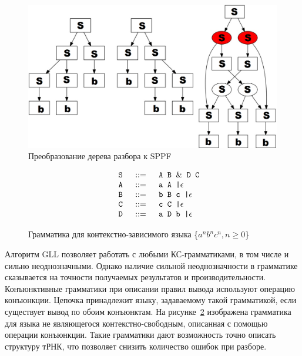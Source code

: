 \documentclass[14pt]{matmex-diploma}
\begin{document}
\begin{figure}
\centering
\includegraphics[width=14cm]{courseworkpictures/SPPF.PNG}
\caption{Преобразование дерева разбора к SPPF}
\label{SPPF}
\end{figure}

\begin{figure}
$$
\begin{array}{crcl}
& \mbox{\texttt{ S }} &::=& \mbox{\texttt{ A B }} \& \mbox{\texttt{ D C}} \\
& \mbox{\texttt{ A }} & ::=& \mbox{\texttt{ a A |}}  \epsilon \\
& \mbox{\texttt{ B }} & ::=& \mbox{\texttt{ b B c |}}  \epsilon \\
& \mbox{\texttt{ C }} & ::=& \mbox{\texttt{ c C |}}  \epsilon \\
& \mbox{\texttt{ D }} & ::=& \mbox{\texttt{ a D b |}}\epsilon \\
\end{array}
$$
\caption{Грамматика для контекстно-зависимого языка \{$a^n b^n c^n, n \geq 0$\}}
\label{gabc}
\end{figure}

Алгоритм GLL позволяет работать с любыми КС-грамматиками, в том числе и сильно неоднозначными. Однако наличие сильной неоднозначности в грамматике сказывается на точности получаемых результатов и производительности. 
  Конъюнктивные грамматики при описании правил вывода используют операцию конъюнкции. Цепочка принадлежит языку, задаваемому такой грамматикой, если существует вывод по обоим конъюнктам. На рисунке~\ref{gabc} изображена грамматика для языка не являющегося контекстно-свободным, описанная с помощью операции конъюнкции. Такие грамматики дают возможность точно описать структуру тРНК, что позволяет снизить количество ошибок при разборе.
\end{document}
